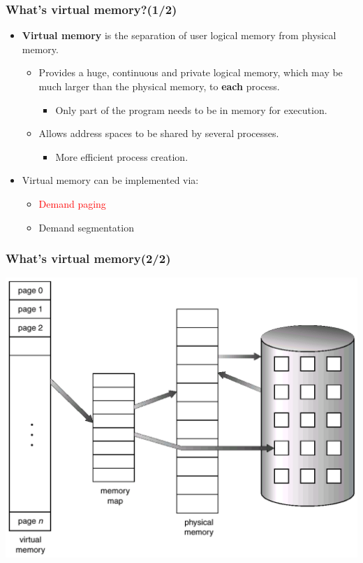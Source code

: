 \documentclass[CJKutf8,xcolor=pdftex,dvipsnames,table]{beamer}
\begin{document}
\begin{CJK*}{UTF8}{song}
  \begin{frame}
    \frametitle{What's virtual memory?(1/2)} \pause
    \begin{itemize}
    \item{\textbf{Virtual memory} is the separation of user logical memory from physical memory.} \pause
      \begin{itemize}
      \item{Provides a huge, continuous and private logical memory, which may be much larger than the physical memory, to \textbf{each} process. } \pause
        \begin{itemize}
        \item{Only part of the program needs to be in memory for execution.} \pause
        \end{itemize}
      \item{Allows address spaces to be shared by several processes.} \pause
        \begin{itemize}
        \item{More efficient process creation.} \pause
        \end{itemize}
      \end{itemize}
    \item{Virtual memory can be implemented via:} \pause
      \begin{itemize}
      \item{\textcolor{red}{Demand paging}} \pause
      \item{Demand segmentation}
      \end{itemize}
    \end{itemize}
  \end{frame}
  
  \begin{frame}
    \frametitle{What's virtual memory(2/2)} \pause
    \begin{center}
      \includegraphics[scale=.3]{v6f10-1}
    \end{center}
  \end{frame}
  

\end{CJK*}
\end{document}
